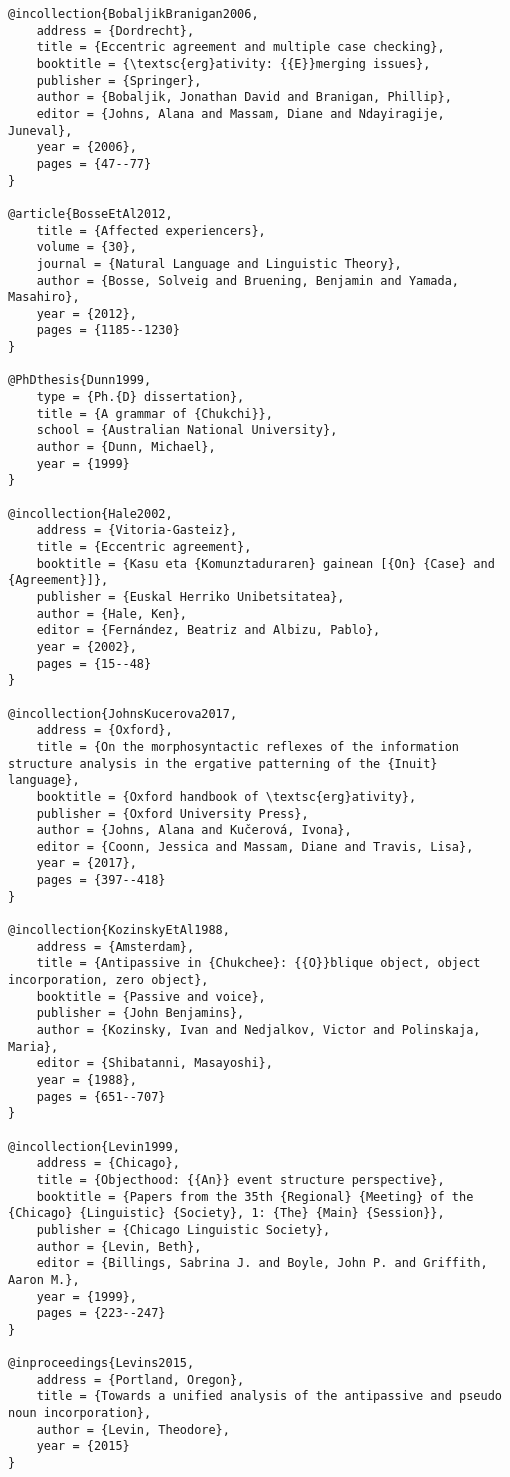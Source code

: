 \documentclass[output=paper,modfonts,nonflat,newtxmath]{langsci/langscibook}
\begin{document}
\begin{verbatim}
@incollection{BobaljikBranigan2006,
	address = {Dordrecht},
	title = {Eccentric agreement and multiple case checking},
	booktitle = {\textsc{erg}ativity: {{E}}merging issues},
	publisher = {Springer},
	author = {Bobaljik, Jonathan David and Branigan, Phillip},
	editor = {Johns, Alana and Massam, Diane and Ndayiragije, Juneval},
	year = {2006},
	pages = {47--77}
}

@article{BosseEtAl2012,
	title = {Affected experiencers},
	volume = {30},
	journal = {Natural Language and Linguistic Theory},
	author = {Bosse, Solveig and Bruening, Benjamin and Yamada, Masahiro},
	year = {2012},
	pages = {1185--1230}
}

@PhDthesis{Dunn1999,
	type = {Ph.{D} dissertation},
	title = {A grammar of {Chukchi}},
	school = {Australian National University},
	author = {Dunn, Michael},
	year = {1999}
}

@incollection{Hale2002,
	address = {Vitoria-Gasteiz},
	title = {Eccentric agreement},
	booktitle = {Kasu eta {Komunztaduraren} gainean [{On} {Case} and {Agreement}]},
	publisher = {Euskal Herriko Unibetsitatea},
	author = {Hale, Ken},
	editor = {Fernández, Beatriz and Albizu, Pablo},
	year = {2002},
	pages = {15--48}
}

@incollection{JohnsKucerova2017,
	address = {Oxford},
	title = {On the morphosyntactic reflexes of the information structure analysis in the ergative patterning of the {Inuit} language},
	booktitle = {Oxford handbook of \textsc{erg}ativity},
	publisher = {Oxford University Press},
	author = {Johns, Alana and Kučerová, Ivona},
	editor = {Coonn, Jessica and Massam, Diane and Travis, Lisa},
	year = {2017},
	pages = {397--418}
}

@incollection{KozinskyEtAl1988,
	address = {Amsterdam},
	title = {Antipassive in {Chukchee}: {{O}}blique object, object incorporation, zero object},
	booktitle = {Passive and voice},
	publisher = {John Benjamins},
	author = {Kozinsky, Ivan and Nedjalkov, Victor and Polinskaja, Maria},
	editor = {Shibatanni, Masayoshi},
	year = {1988},
	pages = {651--707}
}

@incollection{Levin1999,
	address = {Chicago},
	title = {Objecthood: {{An}} event structure perspective},
	booktitle = {Papers from the 35th {Regional} {Meeting} of the {Chicago} {Linguistic} {Society}, 1: {The} {Main} {Session}},
	publisher = {Chicago Linguistic Society},
	author = {Levin, Beth},
	editor = {Billings, Sabrina J. and Boyle, John P. and Griffith, Aaron M.},
	year = {1999},
	pages = {223--247}
}

@inproceedings{Levins2015,
	address = {Portland, Oregon},
	title = {Towards a unified analysis of the antipassive and pseudo noun incorporation},
	author = {Levin, Theodore},
	year = {2015}
}


\end{verbatim}
\end{document}
